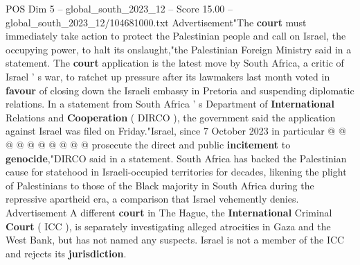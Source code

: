 \begin{textsample}{POS Dim 5 – global\_south\_2023\_12 – Score 15.00 – global\_south\_2023\_12/104681000.txt}
Advertisement"The \textbf{court} must immediately take action to protect the Palestinian people and call on Israel, the occupying power, to halt its onslaught,"the Palestinian Foreign Ministry said in a statement.
The \textbf{court} application is the latest move by South Africa, a critic of Israel ' s war, to ratchet up pressure after its lawmakers last month voted in \textbf{favour} of closing down the Israeli embassy in Pretoria and suspending diplomatic relations.
In a statement from South Africa ' s Department of \textbf{International} Relations and \textbf{Cooperation} ( DIRCO ), the government said the application against Israel was filed on Friday."Israel, since 7 October 2023 in particular @ @ @ @ @ @ @ @ @ @ prosecute the direct and public \textbf{incitement} to \textbf{genocide},"DIRCO said in a statement.
South Africa has backed the Palestinian cause for statehood in Israeli-occupied territories for decades, likening the plight of Palestinians to those of the Black majority in South Africa during the repressive apartheid era, a comparison that Israel vehemently denies.
Advertisement A different \textbf{court} in The Hague, the \textbf{International} Criminal \textbf{Court} ( ICC ), is separately investigating alleged atrocities in Gaza and the West Bank, but has not named any suspects.
Israel is not a member of the ICC and rejects its \textbf{jurisdiction}.

\end{textsample}
